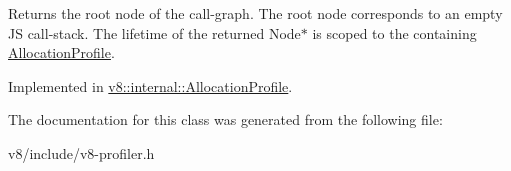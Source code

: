 Returns the root node of the call-\/graph. The root node corresponds to an empty JS call-\/stack. The lifetime of the returned Node$\ast$ is scoped to the containing \mbox{\hyperlink{classv8_1_1AllocationProfile}{Allocation\+Profile}}. 

Implemented in \mbox{\hyperlink{classv8_1_1internal_1_1AllocationProfile_abb93406eaccd8b37de3e080d0620bc2b}{v8\+::internal\+::\+Allocation\+Profile}}.



The documentation for this class was generated from the following file\+:\begin{DoxyCompactItemize}
\item 
v8/include/v8-\/profiler.\+h\end{DoxyCompactItemize}
